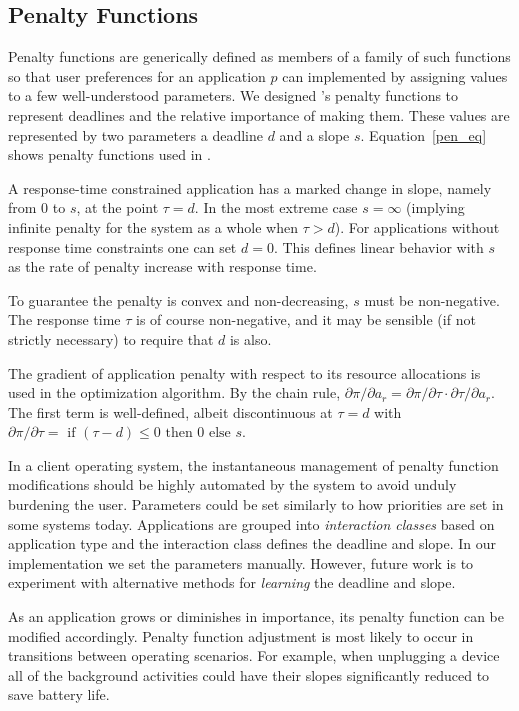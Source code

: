 \subsection*{Penalty Functions}
Penalty functions are generically defined as members of a family of such functions
so that user preferences for an application $p$ can implemented by assigning values to a few well-understood parameters.
We designed \pacora's penalty functions to represent deadlines and the relative importance of making them.
These values are represented by two parameters a deadline $d$ and a slope $s$.  Equation~\ref{pen_eq} shows penalty functions used in \pacora.

A response-time constrained application has a marked change in slope, namely from 0 to $s$, at the point $\tau= d$. In the most extreme case $s = \infty$ (implying infinite penalty for the system as a whole when $\tau > d$).  For applications without response time constraints one can set $d = 0$. This defines linear behavior with $s$ as the rate of penalty increase with response time.

To guarantee the penalty is convex and non-decreasing, $s$ must be non-negative.
The response time $\tau$  is of course non-negative, and it may be sensible (if not strictly necessary) to require that $d$ is also.

The gradient of application penalty with respect to its resource allocations is used in the optimization algorithm.
By the chain rule, $\partial\pi/\partial a_r = \partial\pi/\partial\tau\cdot\partial\tau/\partial a_r$.
The first term is well-defined, albeit discontinuous at $\tau = d$ with
$\partial\pi/\partial\tau = \mbox{ if } (\tau - d) \leq 0 \mbox{ then } 0 \mbox{ else } s$.

In a client operating system, the instantaneous management of penalty function modifications should be highly automated by the system to avoid unduly burdening the user. Parameters could be set similarly to how priorities are set in some systems today. Applications are grouped into \emph{interaction classes} based on application type and the interaction class defines the deadline and slope.  In our implementation we set the parameters manually. However, future work is to experiment with alternative methods for \emph{learning} the deadline and slope.


As an application grows or diminishes in importance, its penalty function can be modified accordingly.  Penalty function adjustment is most likely to occur in transitions between operating scenarios.  For example, when unplugging a device all of the background activities could have their slopes significantly reduced to save battery life.

